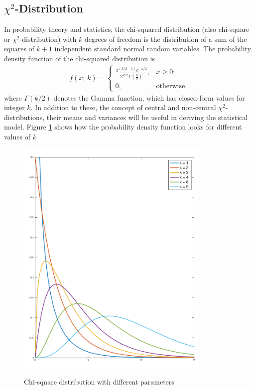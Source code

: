 \subsection{$\chi^2$-Distribution} \citep{chi_square_definition_book} In probability theory and statistics, the chi-squared distribution (also chi-square or $\chi^2$-distribution) with $k$ degrees of freedom is the distribution of a sum of the squares of $k+1$ independent standard normal random variables. The probability density function of the chi-squared distribution is
\begin{eqnarray}
f(x;\,k) =
\begin{cases}
  \frac{x^{(k/2-1)} e^{-x/2}}{2^{k/2} \Gamma\left(\frac{k}{2}\right)},  & x \geq 0; \\ 0, & \text{otherwise}.
\end{cases}
\end{eqnarray}
where $\Gamma(k/2)$ denotes the Gamma function, which has closed-form values for integer $k$. In addition to these, the concept of central and non-central $\chi^2$-distributions, their means and variances will be useful in deriving the statistical model. Figure \ref{fig:chi-square_distribution} shows how the probability density function looks for different values of $k$
\begin{figure}[h!]
	\centering
    \includegraphics[width=.9\textwidth, height = 12cm]{images/ChiSquareDistribution}
    \caption{Chi-square distribution with different parameters}
    \label{fig:chi-square_distribution}
\end{figure}
